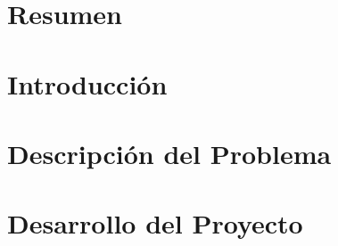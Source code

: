\documentclass[11pt,twoside]{thesis}
\begin{document}
\maketitle
\makecoverletter

\chapter*{Resumen} 

  
  
 \tableofcontents 


\dominitoc
\cleardoublepage

\chapter*{Introducci\'on}


\chapter{Descripci\'on del Problema}


\chapter{Desarrollo del Proyecto}







\end{document}
